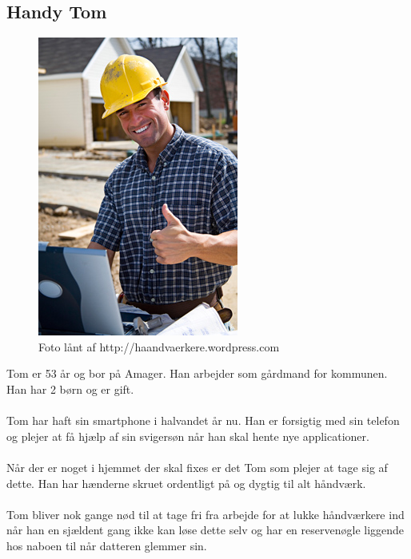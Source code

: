 \documentclass[a4paper,12pt]{article}
\begin{document}
\subsection{Handy Tom}
\begin{figure}[h!]
\centering
\includegraphics[scale=0.5]{tom}
\caption{Foto lånt af http://haandvaerkere.wordpress.com}
\label{fig: tom}
\end{figure}
Tom er 53 år og bor på Amager. Han arbejder som gårdmand for kommunen. Han har 2 børn og er gift.
\\ \\
Tom har haft sin smartphone i halvandet år nu. Han er forsigtig med sin telefon og plejer at få hjælp af sin svigersøn når han skal hente nye applicationer.
\\ \\
Når der er noget i hjemmet der skal fixes er det Tom som plejer at tage sig af dette. Han har hænderne skruet ordentligt på og dygtig til alt håndværk.
\\ \\
Tom bliver nok gange nød til at tage fri fra arbejde for at lukke håndværkere ind når han en sjældent gang ikke kan løse dette selv og har en reservenøgle liggende hos naboen til når datteren glemmer sin.
\end{document}
